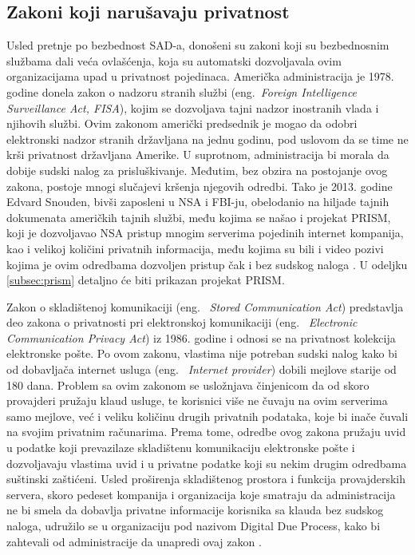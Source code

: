 \documentclass[a4paper]{article}
\begin{document}
\subsection{Zakoni koji narušavaju privatnost}
\label{subsec:zakoni}
\par Usled pretnje po bezbednost SAD-a, donošeni su zakoni koji su bezbednosnim službama dali veća ovlašćenja, koja su automatski dozvoljavala ovim organizacijama upad u privatnost pojedinaca. Američka administracija je 1978. godine donela zakon o nadzoru stranih službi (eng.~{\em Foreign Intelligence Surveillance Act, FISA}), kojim se dozvoljava tajni nadzor inostranih vlada i njihovih službi. Ovim zakonom američki predsednik je mogao da odobri elektronski nadzor stranih državljana na jednu godinu, pod uslovom da se time ne krši privatnost državljana Amerike. U suprotnom, administracija bi morala da dobije sudski nalog za prisluškivanje. Međutim, bez obzira na postojanje ovog zakona, postoje mnogi slučajevi kršenja njegovih odredbi. Tako je 2013. godine Edvard Snouden, bivši zaposleni u NSA i FBI-ju, obelodanio  na  hiljade  tajnih  dokumenata  američkih tajnih službi, među kojima se našao i projekat PRISM, koji je dozvoljavao NSA pristup mnogim serverima pojedinih internet kompanija, kao i velikoj količini privatnih informacija, među kojima su bili i video pozivi kojima je ovim odredbama dozvoljen pristup čak i bez sudskog naloga \cite{prism}. U odeljku \ref{subsec:prism} detaljno će biti prikazan projekat PRISM.
\par Zakon o skladištenoj komunikaciji (eng. ~{\em Stored Communication Act}) predstavlja deo zakona o privatnosti pri elektronskoj komunikaciji (eng. ~{\em Electronic Communication Privacy Act}) iz 1986. godine i odnosi se na privatnost kolekcija elektronske pošte. Po ovom zakonu, vlastima nije potreban sudski nalog kako bi od dobavljača internet usluga (eng. ~{\em Internet provider}) dobili mejlove starije od 180 dana. Problem sa ovim zakonom se usložnjava činjenicom da od skoro provajderi pružaju klaud usluge, te korisnici više ne čuvaju na ovim serverima samo mejlove, već i veliku količinu drugih privatnih podataka, koje bi inače čuvali na svojim privatnim računarima. Prema tome, odredbe ovog zakona pružaju uvid u podatke koji prevazilaze skladištenu komunikaciju elektronske pošte i dozvoljavaju vlastima uvid i u privatne podatke koji su nekim drugim odredbama suštinski zaštićeni. Usled proširenja skladištenog prostora i funkcija provajderskih servera, skoro pedeset kompanija i organizacija koje smatraju da administracija ne bi smela da dobavlja privatne informacije korisnika sa klauda bez sudskog naloga, udružilo se u organizaciju pod nazivom Digital Due Process, kako bi zahtevali od administracije da unapredi ovaj zakon \cite{ddp}.
\end{document}
